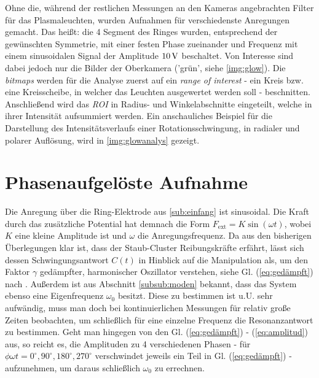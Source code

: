\documentclass[numbers=noenddot,a4paper,notitlepage,twoside,BCOR15mm]{scrbook}
\newcommand{\degree}{^\circ}
\newcommand{\ix}[1]{_\text{#1}}
\newcommand{\tilt}[1]{\textit{#1}}
\newcommand{\fett}[1]{\textbf{#1}}
\begin{document}
		Ohne die, während der restlichen Messungen an den Kameras angebrachten Filter für das Plasmaleuchten, wurden Aufnahmen für verschiedenste Anregungen gemacht. Das heißt: die 4 Segment des Ringes wurden, entsprechend der gewünschten Symmetrie, mit einer festen Phase zueinander und Frequenz mit einem sinusoidalen Signal der Amplitude $\unit[10]{V}$ beschaltet. Von Interesse sind dabei jedoch nur die Bilder der Oberkamera ('grün', siehe \ref{img:glow}). Die \tilt{bitmaps} werden für die Analyse zuerst auf ein \tilt{range of interest} - ein Kreis bzw. eine Kreisscheibe, in welcher das Leuchten ausgewertet werden soll - beschnitten. Anschließend wird das \tilt{ROI} in Radius- und Winkelabschnitte eingeteilt, welche in ihrer Intensität aufsummiert werden. Ein anschauliches Beispiel für die Darstellung des Intensitätsverlaufs einer Rotationsschwingung, in radialer und polarer Auflösung, wird in \ref{img:glowanalys} gezeigt.


		\section{Phasenaufgelöste Aufnahme}\label{sec:phasen}

			Die Anregung über die Ring-Elektrode aus \ref{sub:einfang} ist sinusoidal. Die Kraft durch das zusätzliche Potential hat demnach die Form $F\ix{ext}=K\sin\left(\omega t\right)$, wobei $K$ eine kleine Amplitude ist und $\omega$ die Anregungsfrequenz. Da aus den bisherigen Überlegungen klar ist, dass der Staub-Cluster Reibungskräfte erfährt, lässt sich dessen Schwingungsantwort $C\left(t\right)$ in Hinblick auf die Manipulation als, um den Faktor $\gamma$ gedämpfter, harmonischer Oszillator verstehen, siehe Gl. (\ref{eq:gedämpft}) nach \cite{Carstensen11}. Außerdem ist aus Abschnitt \ref{subsub:moden} bekannt, dass das System ebenso eine Eigenfrequenz $\omega\ix{0}$ besitzt. Diese zu bestimmen ist u.U. sehr aufwändig, muss man doch bei kontinuierlichen Messungen für relativ große Zeiten beobachten, um schließlich für eine einzelne Frequenz die Resonanzantwort zu bestimmen. Geht man hingegen von den Gl. (\ref{eq:gedämpft}) - (\ref{eq:amplitud}) aus, so reicht es, die Amplituden zu 4 verschiedenen Phasen - für $\phi\omega t=0\degree,90\degree,180\degree,270\degree$ verschwindet jeweils ein Teil in Gl. (\ref{eq:gedämpft}) - aufzunehmen, um daraus schließlich $\omega\ix{0}$ zu errechnen.
\end{document}
